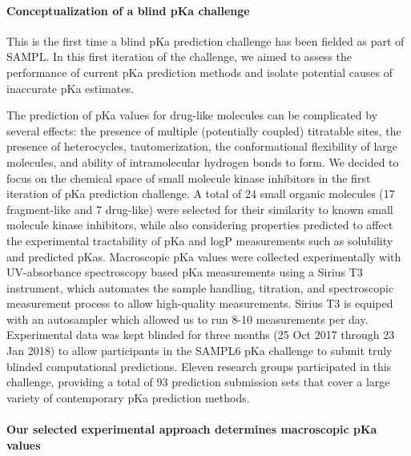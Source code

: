 \documentclass[9pt,lineno]{elife}
\begin{document}
\paragraph{Conceptualization of a blind pKa challenge}

This is the first time a blind pKa prediction challenge has been fielded as part of SAMPL. 
In this first iteration of the challenge, we aimed to assess the performance of current pKa prediction methods and isolate potential causes of inaccurate pKa estimates.

The prediction of pKa values for drug-like molecules can be complicated by several effects: the presence of multiple (potentially coupled) titratable sites, the presence of heterocycles, tautomerization, the conformational flexibility of large molecules, and ability of intramolecular hydrogen bonds to form. 
We decided to focus on the chemical space of small molecule kinase inhibitors in the first iteration of pKa prediction challenge. 
A total of 24 small organic molecules (17 fragment-like and 7 drug-like) were selected for their similarity to known small molecule kinase inhibitors, while also considering properties predicted to affect the experimental tractability of pKa and logP measurements such as solubility and predicted pKas. 
Macroscopic pKa values were collected experimentally with UV-absorbance spectroscopy based pKa measurements using a Sirius T3 instrument, which automates the sample handling, titration, and spectroscopic measurement process to allow high-quality measurements. Sirius T3 is equiped with an autosampler which allowed us to run 8-10 measurements per day.
Experimental data was kept blinded for three months (25 Oct 2017 through 23 Jan 2018) to allow participants in the SAMPL6 pKa challenge to submit truly blinded computational predictions. 
Eleven research groups participated in this challenge, providing a total of 93 prediction submission sets that cover a large variety of contemporary pKa prediction methods. 
 
\paragraph{Our selected experimental approach determines macroscopic pKa values}
\end{document}
